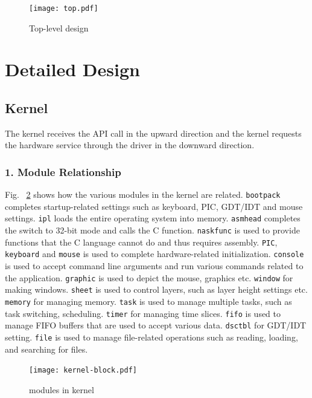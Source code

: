 \documentclass{swfcthesis}
\begin{document}
\begin{figure}[!htbp]
  \centering
  \texttt{[image: top.pdf]}
  \caption{Top-level design}
  \label{fig:top-level}
\end{figure}


\section{Detailed Design}
\label{sec:detailed-design}



\subsection{Kernel}
\label{sec:kernel}
The kernel receives the API call in the upward direction and the kernel requests the
hardware service through the driver in the downward direction.

\subsubsection{1. Module Relationship}
\label{sec:overview-1}

Fig. ~\ref{fig:kernel} shows how the various modules in
the kernel are related. \texttt{bootpack} completes startup-related settings such as
keyboard, PIC, GDT/IDT and mouse settings. \texttt{ipl} loads the entire operating system
into memory. \texttt{asmhead} completes the switch to 32-bit mode and calls the C
function. \texttt{naskfunc} is used to provide functions that the C language cannot do and
thus requires assembly. \texttt{PIC}, \texttt{keyboard} and \texttt{mouse} is used to
complete hardware-related initialization. \texttt{console} is used to accept command line
arguments and run various commands related to the application. \texttt{graphic} is used to
depict the mouse, graphics etc. \texttt{window} for making windows. \texttt{sheet} is used to
control layers, such as layer height settings etc. \texttt{memory} for managing
memory. \texttt{task} is used to manage multiple tasks, such as task switching,
scheduling. \texttt{timer} for managing time slices. \texttt{fifo} is used to manage FIFO buffers
that are used to accept various data. \texttt{dsctbl} for GDT/IDT setting. \texttt{file} is used to
manage file-related operations such as reading, loading, and searching for files. 


\begin{figure}[!htbp]
  \centering
  \texttt{[image: kernel-block.pdf]}
  \caption{modules in kernel}
  \label{fig:kernel}
\end{figure}
\end{document}
